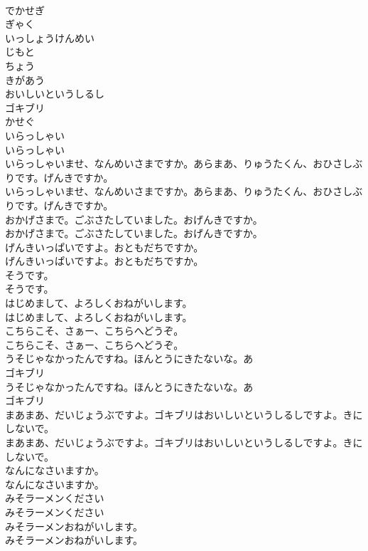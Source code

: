 \documentclass[8pt]{extreport}
\begin{document}
\begin{CJK}{UTF8}{min}
\\	でかせぎ
\\	ぎゃく
\\	いっしょうけんめい
\\	じもと
\\	ちょう
\\	きがあう
\\	おいしいというしるし
\\	ゴキブリ
\\	かせぐ
\\	いらっしゃい
\\	いらっしゃい
\\	いらっしゃいませ、なんめいさまですか。あらまあ、りゅうたくん、おひさしぶりです。げんきですか。
\\	いらっしゃいませ、なんめいさまですか。あらまあ、りゅうたくん、おひさしぶりです。げんきですか。
\\	おかげさまで。ごぶさたしていました。おげんきですか。
\\	おかげさまで。ごぶさたしていました。おげんきですか。
\\	げんきいっぱいですよ。おともだちですか。
\\	げんきいっぱいですよ。おともだちですか。
\\	そうです。
\\	そうです。
\\	はじめまして、よろしくおねがいします。
\\	はじめまして、よろしくおねがいします。
\\	こちらこそ、さぁー、こちらへどうぞ。
\\	こちらこそ、さぁー、こちらへどうぞ。
\\	うそじゃなかったんですね。ほんとうにきたないな。あ
\\	ゴキブリ
\\	うそじゃなかったんですね。ほんとうにきたないな。あ
\\	ゴキブリ
\\	まあまあ、だいじょうぶですよ。ゴキブリはおいしいというしるしですよ。きにしないで。
\\	まあまあ、だいじょうぶですよ。ゴキブリはおいしいというしるしですよ。きにしないで。
\\	なんになさいますか。
\\	なんになさいますか。
\\	みそラーメンください
\\	みそラーメンください
\\	みそラーメンおねがいします。
\\	みそラーメンおねがいします。

\end{CJK}
\end{document}
